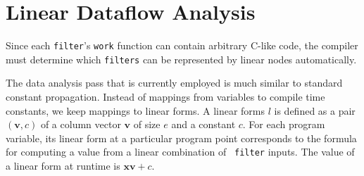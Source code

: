 \section{Linear Dataflow Analysis}
\label{sec:dataflow}

%
%
%


Since each {\tt filter}'s {\tt work} function can contain arbitrary
C-like code, the compiler must determine which {\tt filters} can be
represented by linear nodes automatically.
 
The data analysis pass that is currently employed is much similar to
standard constant propagation.  Instead of mappings from variables to
compile time constants, we keep mappings to linear forms.  A linear
forms $l$ is defined as a pair $({\mathbf v}, c)$ of a column vector
$\mathbf{v}$ of size $e$ and a constant $c$. For each program
variable, its linear form at a particular program point corresponds to
the formula for computing a value from a linear combination of {\tt
filter} inputs. The value of a linear form at runtime is ${\mathbf
x}{\mathbf v} + c$.

